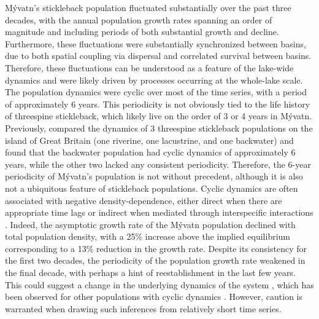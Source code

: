 M\'{y}vatn's stickleback population fluctuated substantially over the past three decades,
with the annual population growth rates spanning an order of magnitude and including
periods of both substantial growth and decline.
Furthermore, these fluctuations were substantially synchronized between basins,
due to both spatial coupling via dispersal
and correlated survival between basins. 
Therefore, these fluctuations can be understood as a feature of the lake-wide dynamics
and were likely driven by processes occurring at the whole-lake scale.
The population dynamics were cyclic over most of the time series,
with a period of approximately 6 years. 
This periodicity is not obviously tied to the life history of threespine stickleback,
which likely live on the order of 3 or 4 years in M\'{y}vatn.
Previously,
\cite{wootton2005} compared the dynamics of 3 threespine stickleback populations 
on the island of Great Britain (one riverine, one lacustrine, and one backwater)
and found that the backwater population had cyclic dynamics of approximately
6 years, while the other two lacked any consistent periodicity.
Therefore, the 6-year periodicity of M\'{y}vatn's population is not without precedent,
although it is also not a ubiquitous feature of stickleback populations.
Cyclic dynamics are often associated with negative density-dependence, 
either direct when there are appropriate time lags \citep{may1974}
or indirect when mediated through interspecific interactions 
\citep{nicholson1935, rosenzweig1963}.
Indeed, the asymptotic growth rate of the M\'{y}vatn population declined 
with total population density,
with a 25\% increase above the implied equilibrium corresponding to a 13\% 
reduction in the  growth rate.
Despite its consistency for the first two decades, 
the periodicity of the population growth rate weakened in the final decade, 
with perhaps a hint of reestablishment in the last few years.
This could suggest a change in the underlying dynamics of the system
\citep{carpenter2011},
which has been observed for other populations with cyclic dynamics
\citep{ims2008collapsing}.
However, caution is warranted when drawing such inferences 
from relatively short time series.

